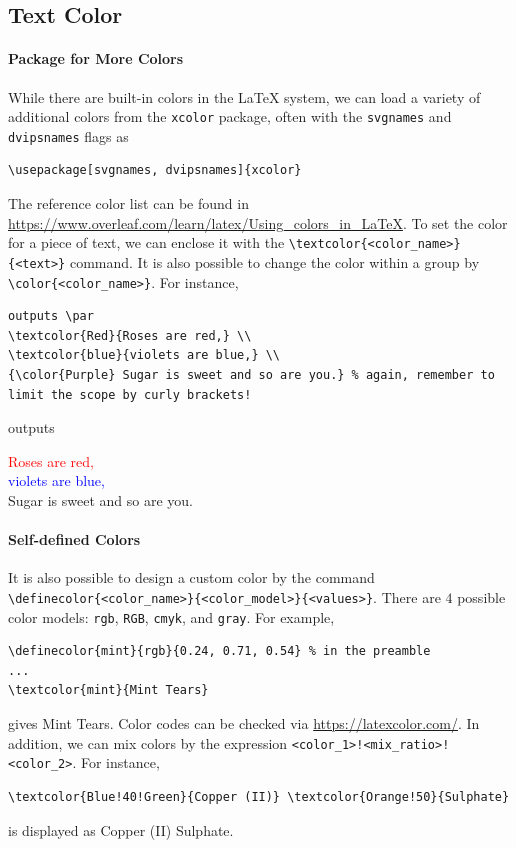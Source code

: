 \subsection{Text Color}

\paragraph{Package for More Colors}
While there are built-in colors in the \LaTeX{} system, we can load a variety of additional colors from the \verb|xcolor| package, often with the \verb|svgnames| and \verb|dvipsnames| flags as
\begin{lstlisting}
\usepackage[svgnames, dvipsnames]{xcolor}    
\end{lstlisting}
The reference color list can be found in \href{https://www.overleaf.com/learn/latex/Using_colors_in_LaTeX}{https://www.overleaf.com/learn/latex/\allowbreak Using\_colors\_in\_LaTeX}. To set the color for a piece of text, we can enclose it with the \texttt{\textbackslash textcolor\{<color\_name>\}\{<text>\}} command. It is also possible to change the color within a group by \texttt{\textbackslash color\{<color\_name>\}}. For instance,
\begin{lstlisting}
outputs \par
\textcolor{Red}{Roses are red,} \\
\textcolor{blue}{violets are blue,} \\ 
{\color{Purple} Sugar is sweet and so are you.} % again, remember to limit the scope by curly brackets!
\end{lstlisting}
outputs \par
\textcolor{Red}{Roses are red,} \\
\textcolor{blue}{violets are blue,} \\ 
{\color{Purple} Sugar is sweet and so are you.}

\paragraph{Self-defined Colors}
It is also possible to design a custom color by the command \texttt{\textbackslash definecolor\{<color\_name>\}\{<color\_model>\}\{<values>\}}. There are $4$ possible color models: \verb|rgb|, \verb|RGB|, \verb|cmyk|, and \verb|gray|. For example,
\begin{lstlisting}
\definecolor{mint}{rgb}{0.24, 0.71, 0.54} % in the preamble
...
\textcolor{mint}{Mint Tears}
\end{lstlisting}
gives \textcolor{mint}{Mint Tears}. Color codes can be checked via \href{https://latexcolor.com/}{https://latexcolor.com/}. In addition, we can mix colors by the expression \texttt{<color\_1>!<mix\_ratio>!\allowbreak <color\_2>}. For instance,
\begin{lstlisting}
\textcolor{Blue!40!Green}{Copper (II)} \textcolor{Orange!50}{Sulphate}
\end{lstlisting}
is displayed as \textcolor{Blue!40!Green}{Copper (II)} \textcolor{Orange!50}{Sulphate}.

